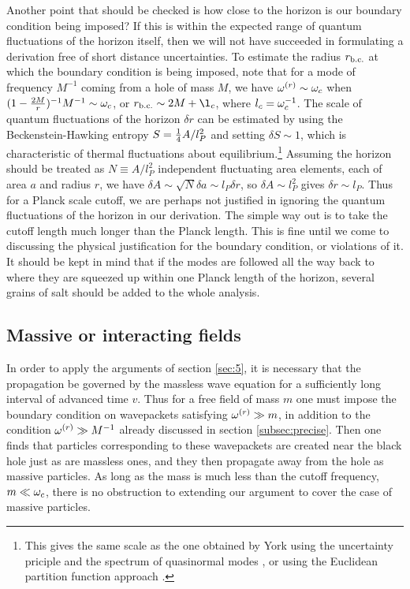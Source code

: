 Another point that should be checked is how close to the horizon is
our boundary condition being imposed? If this is within the
expected range of quantum fluctuations of the horizon itself,
then we will not have succeeded in formulating a derivation
free of short distance uncertainties. To estimate the radius
$r_{\rm b.c.}$ at which the boundary condition is being imposed,
note that for a mode of frequency $M^{-1}$ coming from a hole of
mass $M$, we have $\omega^{(r)}\sim\omega_c$ when
$(1-{2M\over r})^{-1}M^{-1}\sim\omega_c$, or
$r_{\rm b.c.}\sim 2M+ \l_c$, where $l_c=\omega_c^{-1}$.
The scale of quantum fluctuations of
the horizon $\delta r$ can be estimated by using the Beckenstein-Hawking
entropy $S={1\over4} A/l_P^2$ and setting
$\delta S\sim 1$, which is characteristic of thermal
fluctuations about equilibrium.\footnote{This gives the same
scale as the one obtained by York using the
uncertainty priciple and the spectrum of quasinormal modes
\cite{York1}, or using the Euclidean partition
function approach \cite{York2}.}
Assuming the horizon should be treated as $N\equiv A/l_P^2$ independent
fluctuating area elements, each of area $a$ and radius $r$, we
have $\delta A\sim\sqrt{N}\delta a\sim l_P\delta r$,
so $\delta A\sim l_P^2$ gives $\delta r\sim l_P$.
Thus for a Planck scale cutoff, we are perhaps not justified
in ignoring the quantum fluctuations of the horizon in our derivation.
The simple way out is to take the cutoff length much longer than the
Planck length. This is fine until we come to discussing the
physical justification for the boundary condition, or violations
of it. It should be kept in mind that if the modes are followed all
the way back to where they are squeezed up within one Planck length of the
horizon, several grains of salt should be added to the whole analysis.

\subsection{Massive or interacting fields}
\label{subsec:interact}

In order to apply the arguments of section \ref{sec:5},
it is necessary that the propagation be governed by the
massless wave equation for a sufficiently long interval of
advanced time $v$. Thus
for a free field of mass $m$ one must impose the boundary
condition on wavepackets satisfying $\omega^{(r)}\gg m$, in
addition to the condition $\omega^{(r)}\gg M^{-1}$ already discussed
in section \ref{subsec:precise}. Then one finds that particles
corresponding to these wavepackets are created near the
black hole just as are massless ones, and they then propagate
away from the hole as massive particles. As long as the mass
is much less than the cutoff frequency, $m\ll\omega_c$, there is
no obstruction to extending our argument to cover the case
of massive particles.

